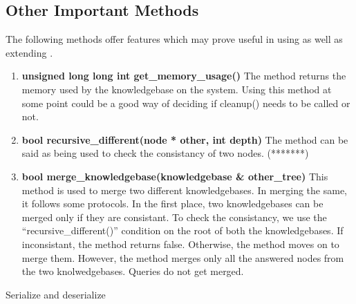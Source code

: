 \subsection{Other Important Methods}
	The following methods offer features which may prove useful in using as well as extending \libalf.
\begin{enumerate}
\item \textbf{unsigned long long int get\_memory\_usage()} \hfill \vskip 1pt
	The method returns the memory used by the knowledgebase on the system. Using this method at some point could be a good way of deciding if cleanup() needs to be called or not. 

\item \textbf{bool recursive\_different(node * other, int depth)} \hfill \vskip 1pt
	The method can be said as being used to check the consistancy of two nodes. (*******)

\item \textbf{bool merge\_knowledgebase(knowledgebase \& other\_tree)} \hfill \vskip 1pt
	This method is used to merge two different knowledgebases. In merging the same, it follows some protocols. In the first place, two knowledgebases can be merged only if they are consistant. To check the consistancy, we use the ``recursive\_different()'' condition on the root of both the knowledgebases. If inconsistant, the method returns false. Otherwise, the method moves on to merge them. However, the method merges only all the answered nodes from the two knolwedgebases. Queries do not get merged. 
\end{enumerate}

\vskip 3pt
Serialize and deserialize

